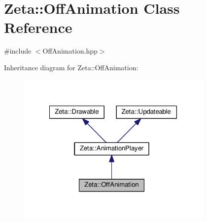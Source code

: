 \hypertarget{classZeta_1_1OffAnimation}{\section{Zeta\+:\+:Off\+Animation Class Reference}
\label{classZeta_1_1OffAnimation}
}


{\ttfamily \#include $<$Off\+Animation.\+hpp$>$}



Inheritance diagram for Zeta\+:\+:Off\+Animation\+:\nopagebreak
\begin{figure}[H]
\begin{center}
\leavevmode
\includegraphics[width=273pt]{classZeta_1_1OffAnimation__inherit__graph}
\end{center}
\end{figure}


